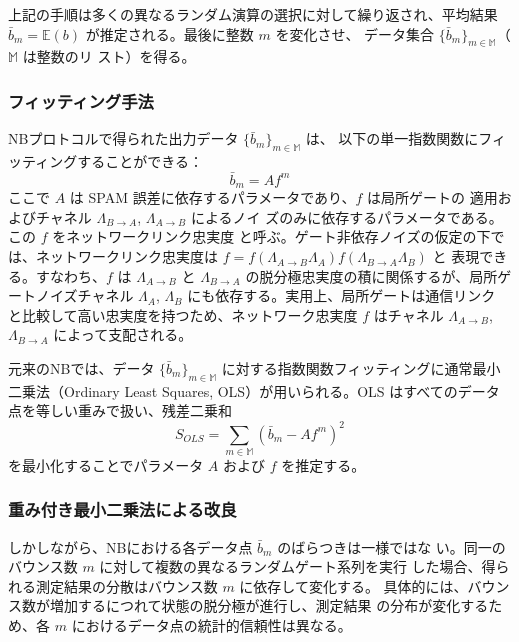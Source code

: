 \documentclass[conference]{IEEEtran}
\begin{document}
上記の手順は多くの異なるランダム演算の選択に対して繰り返され、平均結果
\(\bar{b}_m = \mathbb{E}(b)\) が推定される。最後に整数 \(m\) を変化させ、
データ集合 \(\{\bar{b}_m\}_{m \in \mathbb{M}}\)（\(\mathbb{M}\) は整数のリ
スト）を得る。



\subsubsection*{フィッティング手法}
\label{sec:org155ecd7}
NBプロトコルで得られた出力データ \(\{\bar{b}_m\}_{m \in \mathbb{M}}\) は、
以下の単一指数関数にフィッティングすることができる：
\begin{equation}
\bar{b}_m = A f^m
\end{equation}
ここで \(A\) は SPAM 誤差に依存するパラメータであり、\(f\) は局所ゲートの
適用およびチャネル \(\Lambda_{B \to A}\), \(\Lambda_{A \to B}\) によるノイ
ズのみに依存するパラメータである。この \(f\) をネットワークリンク忠実度
と呼ぶ。ゲート非依存ノイズの仮定の下では、ネットワークリンク忠実度は
\(f = f(\Lambda_{A \to B} \Lambda_A) f(\Lambda_{B \to A} \Lambda_B)\) と
表現できる。すなわち、\(f\) は \(\Lambda_{A \to B}\) と \(\Lambda_{B \to
A}\) の脱分極忠実度の積に関係するが、局所ゲートノイズチャネル
\(\Lambda_A\), \(\Lambda_B\) にも依存する。実用上、局所ゲートは通信リンク
と比較して高い忠実度を持つため、ネットワーク忠実度 \(f\) はチャネル
\(\Lambda_{A \to B}\), \(\Lambda_{B \to A}\) によって支配される。

元来のNBでは、データ \(\{\bar{b}_m\}_{m \in \mathbb{M}}\) に対する指数関数フィッティングに通常最小二乗法（Ordinary Least Squares, OLS）が用いられる。OLS はすべてのデータ点を等しい重みで扱い、残差二乗和
\begin{equation}
S_{OLS} = \sum_{m \in \mathbb{M}} (\bar{b}_m - A f^m)^2
\end{equation}
を最小化することでパラメータ \(A\) および \(f\) を推定する。


\subsubsection*{重み付き最小二乗法による改良}
\label{sec:org9859a74}
しかしながら、NBにおける各データ点 \(\bar{b}_m\) のばらつきは一様ではな
い。同一のバウンス数 \(m\) に対して複数の異なるランダムゲート系列を実行
した場合、得られる測定結果の分散はバウンス数 \(m\) に依存して変化する。
具体的には、バウンス数が増加するにつれて状態の脱分極が進行し、測定結果
の分布が変化するため、各 \(m\) におけるデータ点の統計的信頼性は異なる。
\end{document}

